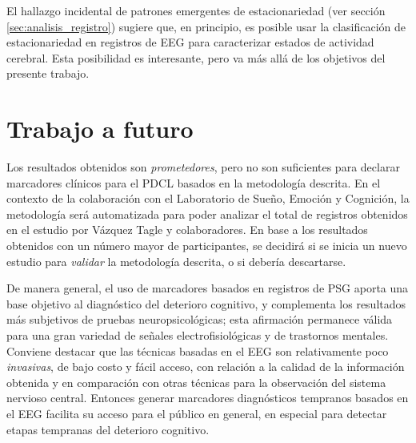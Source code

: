 El hallazgo incidental de patrones emergentes de estacionariedad (ver sección \ref{sec:analisis_registro}) sugiere que, en principio, es posible usar la clasificación de estacionariedad en registros de EEG para caracterizar estados de actividad cerebral. 
%
%
Esta posibilidad es interesante, pero va más allá de los objetivos del presente trabajo.
 


\section{Trabajo a futuro}

Los resultados obtenidos son \textit{prometedores}, pero no son suficientes para declarar marcadores clínicos para el PDCL basados en la metodología descrita.
%
En el contexto de la colaboración con el Laboratorio de Sueño, Emoción y Cognición, la metodología será automatizada para poder analizar el total de registros obtenidos en el estudio por Vázquez Tagle y colaboradores.
%
En base a los resultados obtenidos con un número mayor de participantes, se decidirá si se inicia un nuevo estudio para \textit{validar} la metodología descrita, o si debería descartarse.

%
%

De manera general, el uso de marcadores basados en registros de PSG aporta una base objetivo al diagnóstico del deterioro cognitivo, y complementa los resultados más subjetivos de pruebas neuropsicológicas; esta afirmación permanece válida para una gran variedad de señales electrofisiológicas y de trastornos mentales.
%
Conviene destacar que las técnicas basadas en el EEG son relativamente poco \textit{invasivas}, de bajo costo y fácil acceso, con relación a la calidad de la información obtenida y en comparación con otras técnicas para la observación del sistema nervioso central.
%
Entonces generar marcadores diagnósticos tempranos basados en el EEG facilita su acceso para el público en general, en especial para detectar etapas tempranas del deterioro cognitivo.

